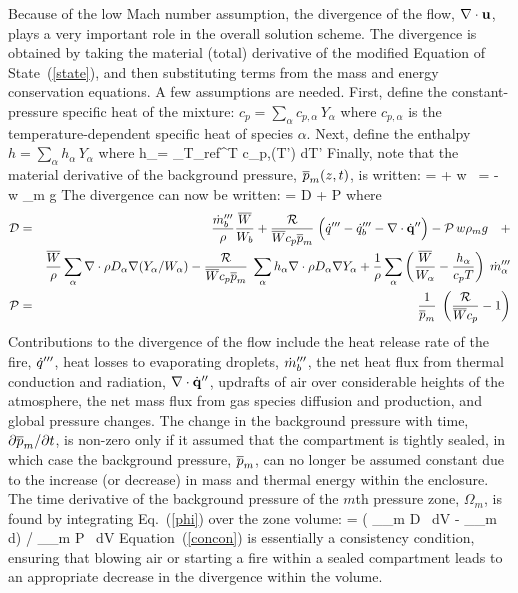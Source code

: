 \documentclass[11pt]{book}
\begin{document}
Because of the low Mach number assumption, the divergence of the flow, $\nabla \cdot {\bf u}$, plays a very important role in the overall
solution scheme. The divergence is obtained by taking the material (total) derivative
of the modified Equation of State~(\ref{state}), and then substituting terms from the mass
and energy conservation equations. A few assumptions are needed. First, define the constant-pressure
specific heat of the mixture: $c_p = \sum_\alpha c_{p,\alpha} \, Y_\alpha$ where
$c_{p,\alpha}$ is the temperature-dependent specific heat of species $\alpha$.
Next, define the enthalpy $h = \sum_\alpha h_\alpha \, Y_\alpha$ where
\be
   h_\alpha = \int_{T_{\hbox{\tiny ref}}}^T c_{p,\alpha}(T') \; dT'
\ee
Finally, note that the material derivative of the background pressure, $\overline{p}_m(z,t)$, is written:
\be {} =  + w \,  =  - w \rho_m g   \ee
The divergence can now be written:
\be \nabla \cdot \bu = {\cal D} + {\cal P} \;   \label{phi} \ee
where
\begin{eqnarray*}
\cal{D}          &=& \frac{\dot{m}_b'''}{\rho} \frac{\overline{W}}{W_b} +  \frac{{\cal R}}{\overline{W} c_p \overline{p}_m} \; \Big( \dot{q}''' - \dot{q}_b''' - \nabla \cdot \dot{\bf q}'' \Big) - {\cal P} \, w \rho_m g  \quad + \nonumber \\
                 & & \frac{\overline{W}}{\rho} \sum_\alpha \nabla \cdot \rho D_\alpha \nabla (Y_\alpha/W_\alpha) -
\frac{{\cal R}}{\overline{W} c_p \overline{p}_m} \; \sum_\alpha h_\alpha \nabla \cdot \rho D_\alpha \nabla Y_\alpha +
 \frac{1}{\rho} \sum_\alpha \left( \frac{\overline{W}}{W_\alpha} - \frac{h_\alpha}{c_p T} \right) \; \dot{m}_\alpha''' \\
\cal{P}          &=& \frac{1}{\overline{p}_m} \; \left( \frac{{\cal R}}{\overline{W} c_p} - 1 \right)
\end{eqnarray*}
Contributions to the divergence of the flow include the heat release rate of the fire, $\dot{q}'''$, heat losses to evaporating droplets, $\dot{m}_b'''$,
the net heat flux from thermal conduction and
radiation, $\nabla \cdot \dot{\bf q}''$, updrafts of air over considerable heights of the atmosphere,
the net mass flux from gas species diffusion and production, and global pressure changes.
The change in the background pressure with time, $\partial \overline{p}_m/\partial t$,
is non-zero only if it assumed that the compartment is tightly sealed,
in which case the background pressure, $\overline{p}_m$, can no longer be assumed constant due to the
increase (or decrease) in mass and thermal energy within
the enclosure. The time derivative of the background pressure of the $m$th pressure zone, $\Omega_m$,
is found by integrating Eq.~(\ref{phi}) over the
zone volume:
\be {} = \left( \int_{\Omega_m} {\cal D} \, dV - \int_{\partial \Omega_m}
 \bu \cdot d\bS \right) \Big/ \int_{\Omega_m} {\cal P} \, dV  \label{concon} \ee
Equation~(\ref{concon}) is essentially a consistency condition, ensuring that blowing air or starting a fire within a sealed
compartment leads to an appropriate decrease in the divergence within the volume.
\end{document}
